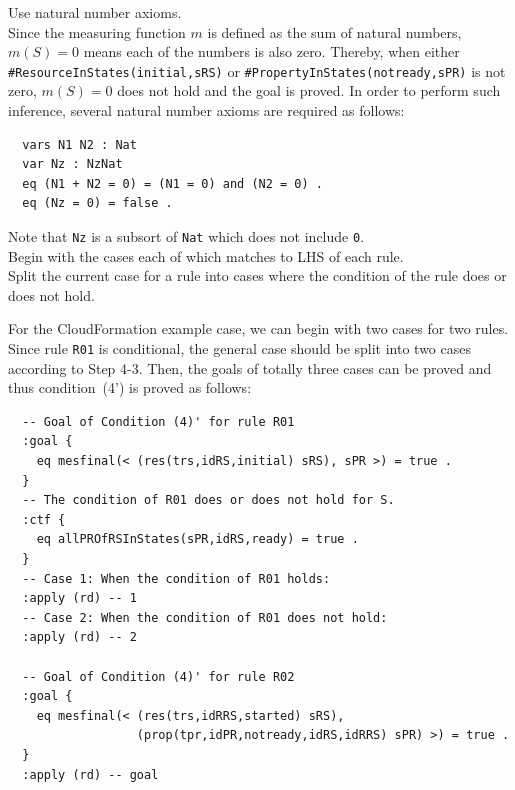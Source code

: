\documentclass[12pt]{report}
\newcommand{\stt}[1]{{\small{\tt {#1}}}}
\begin{document}
\vspace{0.3cm}
 Use natural number axioms. \\
Since the measuring function $m$ is defined as the sum of natural
numbers, $m(S) = 0$ means each of the numbers is also zero. Thereby,
when either \stt{\#ResourceInStates(initial,sRS)} or
\stt{\#PropertyInStates(notready,sPR)} is not zero, $m(S) = 0$ does
not hold and the goal is proved. In order to perform such inference,
several natural number axioms are required as follows:
\small
\begin{verbatim}
  vars N1 N2 : Nat
  var Nz : NzNat
  eq (N1 + N2 = 0) = (N1 = 0) and (N2 = 0) .
  eq (Nz = 0) = false .
\end{verbatim}
\normalsize
Note that {\tt Nz} is a subsort of {\tt Nat} which does not
include {\tt 0}.\\

\vspace{0.3cm}
 Begin with the cases each of which matches to
LHS of each rule. \\ 
 Split the current case for a rule into
cases where the condition of the rule does or does not hold. 

For the CloudFormation example case, we can begin with two cases for
two rules. Since rule {\tt R01} is conditional, the general case
should be split into two cases according to Step 4-3. Then, the goals
of totally three cases can be proved and thus condition~(4') is proved
as follows:
\small
\begin{verbatim}
  -- Goal of Condition (4)' for rule R01
  :goal {
    eq mesfinal(< (res(trs,idRS,initial) sRS), sPR >) = true .
  }
  -- The condition of R01 does or does not hold for S.
  :ctf {
    eq allPROfRSInStates(sPR,idRS,ready) = true .
  }
  -- Case 1: When the condition of R01 holds:
  :apply (rd) -- 1
  -- Case 2: When the condition of R01 does not hold:
  :apply (rd) -- 2

  -- Goal of Condition (4)' for rule R02
  :goal {
    eq mesfinal(< (res(trs,idRRS,started) sRS),
                  (prop(tpr,idPR,notready,idRS,idRRS) sPR) >) = true .
  }
  :apply (rd) -- goal
\end{verbatim}
\normalsize
\end{document}

